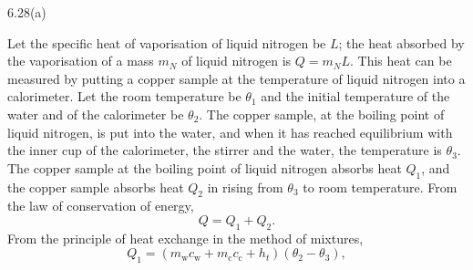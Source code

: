 \begin{figbox}{6.28(a)}
\end{figbox}
Let the specific heat of vaporisation of liquid nitrogen be $L$; the heat absorbed by the vaporisation of a mass $m_N$ of liquid nitrogen is $Q=m_NL$. This heat can be measured by putting a copper sample at the temperature of liquid nitrogen into a calorimeter. Let the room temperature be $\theta_1$ and the initial temperature of the water and of the calorimeter be $\theta_2$. The copper sample, at the boiling point of liquid nitrogen, is put into the water, and when it has reached equilibrium with the inner cup of the calorimeter, the stirrer and the water, the temperature is $\theta_3$. The copper sample at the boiling point of liquid nitrogen absorbs heat $Q_1$, and the copper sample absorbs heat $Q_2$ in rising from $\theta_3$ to room temperature. From the law of conservation of energy,
\begin{equation*}
Q=Q_1+Q_2 .
\end{equation*}
From the principle of heat exchange in the method of mixtures,
\begin{equation*}
Q_1=(m_{\mathrm{w}}c_{\mathrm{w}}+m_{\mathrm{c}}c_{\mathrm{c}}+h_t)(\theta_2-\theta_3),
\end{equation*}
